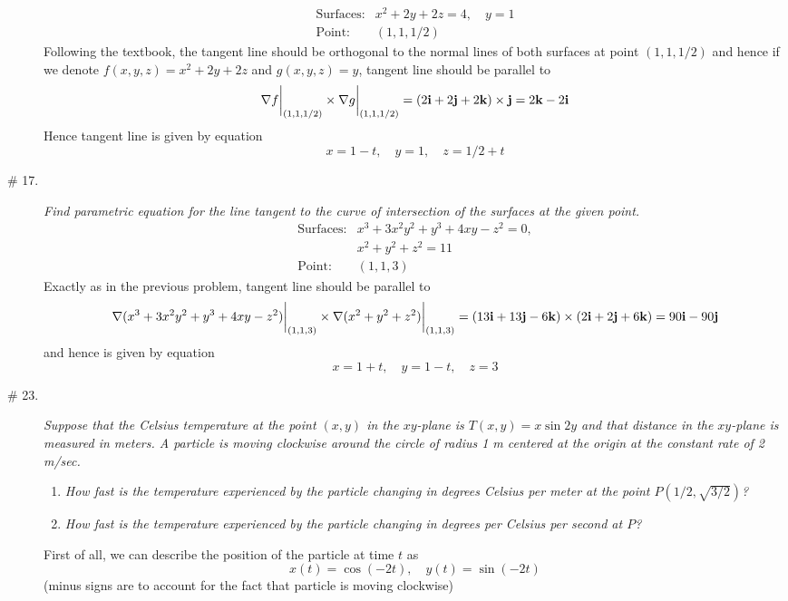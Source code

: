\documentclass[8pt]{article} %
\begin{document}
\begin{description}
{		\[\begin{array}{ll}
			\mbox{Surfaces:} &x^2+2y+2z=4,\quad y=1\\
			\mbox{Point:} &(1,1,1/2)
		\end{array}\]
		Following the textbook, the tangent line should be orthogonal to the normal lines of both surfaces at point $(1,1,1/2)$ and
		hence if we denote $f(x,y,z)=x^2+2y+2z$ and $g(x,y,z)=y$, tangent line should be parallel to
		\[\nabla f\bigg|_{(1,1,1/2)}\times \nabla g\bigg|_{(1,1,1/2)}=\left(2\mathbf{i}+2\mathbf{j}+2\mathbf{k}\right)\times
		\mathbf{j}=2\mathbf{k}-2\mathbf{i}\]
		Hence tangent line is given by equation
		\[x=1-t,\quad y=1,\quad z=1/2+t\]
		}
	\item[\# 17.]{{\it Find parametric equation for the line tangent to the curve of intersection of the surfaces at the given point.}
		\[\begin{array}{ll}
			\mbox{Surfaces:} &x^3+3x^2y^2+y^3+4xy-z^2=0,\\
			&x^2+y^2+z^2=11\\
			\mbox{Point:} &(1,1,3)
		\end{array}\]
	Exactly as in the previous problem, tangent line should be parallel to
		\[\nabla (x^3+3x^2y^2+y^3+4xy-z^2
		)\bigg|_{(1,1,3)}\times \nabla(x^2+y^2+z^2)\bigg|_{(1,1,3)}=\left(13\mathbf{i}+13\mathbf{j}-6\mathbf{k}\right)\times
		\left(2\mathbf{i}+2\mathbf{j}+6\mathbf{k}\right)=90\mathbf{i}-90\mathbf{j}\]
		and hence is given by equation
		\[x=1+t,\quad y=1-t,\quad z=3\]
		}
	\item[\# 23.]{{\it Suppose that the Celsius temperature at the point $(x,y)$ in the $xy$-plane is $T(x,y)=x\sin 2y$ and that distance in
		the $xy$-plane is measured in meters. A particle is moving {\textit clockwise} around the circle of radius 1 m centered at the origin
		at the constant rate of 2 m/sec.}
		\begin{enumerate}[\bfseries(a)]
			\item {\it How fast is the temperature experienced by the particle changing in degrees Celsius per meter at the point
				$P(1/2,\sqrt{3/2})$?}
			\item {\it How fast is the temperature experienced by the particle changing in degrees per Celsius per second at $P$?}
		\end{enumerate}
		First of all, we can describe the position of the particle at time $t$ as \[x(t)=\cos(-2t),\quad y(t)=\sin(-2t)\]
		(minus signs are to account for the fact that particle is moving clockwise)
		\begin{enumerate}[\bfseries(a)]

\end{enumerate}}
\end{description}
\end{document}
